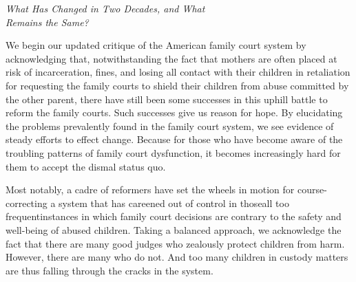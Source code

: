 

\hspace{-5em}\begin{minipage}{1.1\textwidth}
\begin{flushright}
{\fontsize{16}{22}\selectfont
\textbf{%
}
}
\end{flushright}
\end{minipage}


\vspace{6em}



\hspace{-12.5em}\begin{minipage}{1.3\textwidth}
\begin{flushright}
{\fontsize{19}{22}\selectfont
\textsf{\textit{What Has Changed in Two Decades, and What\\\vspace{5pt}
Remains the Same?}}
}
\end{flushright}
\end{minipage}

\vspace{9em}



\pfl{}

\noindent{}We begin our updated critique of the American family court system by
acknowledging that, notwithstanding the fact that mothers are often
placed at risk of incarceration, fines, and losing all contact with their
children in retaliation for requesting the family courts to shield their
children from abuse committed by the other parent, there have still been some successes in this uphill battle to reform the family courts. Such
successes give us reason for hope. By elucidating the problems prevalently found in the family court system, we see evidence of steady efforts
to effect change. Because for those who have become aware of the troubling patterns of family court dysfunction, it becomes increasingly hard for them
to accept the dismal status quo. \pfl{}

Most notably, a cadre of reformers have set the wheels in motion for
course-correcting a system that has careened out of control in those\mdash{}all
too frequent\mdash{}instances in which family court decisions are contrary 
to the safety and well-being of abused
children. Taking a balanced approach, we acknowledge the fact that
there are many good judges who zealously protect children from harm.
However, there are many who do not. And too many children in custody
matters are thus falling through the cracks in the system. \pfl{}

